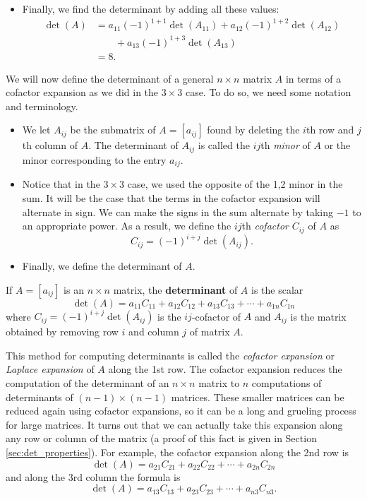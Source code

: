 \begin{itemize}
\item Finally, we find the determinant by adding all these values:
\begin{align*}
 \det(A) &= a_{11} (-1)^{1+1} \det(A_{11}) + a_{12} (-1)^{1+2} \det(A_{12}) \\
	&\qquad + a_{13} (-1)^{1+3} \det(A_{13}) \\
	&= 8.
\end{align*}

\end{itemize}

\label{sec:cofactors}

We will now define the determinant of a general $n \times n$ matrix $A$ in terms of a cofactor expansion as we did in the $3 \times 3$ case. To do so, we need some notation and terminology.

\begin{itemize}
\item We let $A_{ij}$ be the submatrix of $A = [a_{ij}]$ found by deleting the $i$th row and $j$th column of $A$. The determinant of $A_{ij}$ is called the $ij$th \emph{minor} of $A$ or the minor corresponding to the entry $a_{ij}$.
\item Notice that in the $3 \times 3$ case, we used the opposite of the 1,2 minor in the sum. It will be the case that the terms in the cofactor expansion will alternate in sign. We can make the signs in the sum alternate by taking $-1$ to an appropriate power. As a result, we define the $ij$th \emph{cofactor} $C_{ij}$ of $A$ as
\[C_{ij} = (-1)^{i+j} \det\left(A_{ij}\right).\]
\item Finally, we define the determinant of $A$. 
\end{itemize}

\begin{definition} If $A=[a_{ij}]$ is an $n \times n$ matrix, the \textbf{determinant} of $A$ is the scalar 
\[\det(A) = a_{11}C_{11} + a_{12}C_{12} + a_{13}C_{13} + \cdots + a_{1n}C_{1n}\]
where $C_{ij}= (-1)^{i+j} \det(A_{ij})$ is the $ij$-cofactor of $A$ and $A_{ij}$ is the matrix obtained by removing row $i$ and column $j$ of matrix $A$.
\end{definition}


This method for computing determinants is called the \emph{cofactor expansion} or \emph{Laplace expansion} of $A$ along the 1st row. The cofactor expansion reduces the computation of the determinant of an $n \times n$ matrix to $n$ computations of determinants of $(n-1) \times (n-1)$ matrices. These smaller matrices can be reduced again using cofactor expansions, so it can be a long and grueling process for large matrices. It turns out that we can actually take this expansion along any row or column of the matrix (a proof of this fact is given in Section \ref{sec:det_properties}). For example, the cofactor expansion along the 2nd row is  
\[\det(A) = a_{21}C_{21} + a_{22}C_{22} + \cdots + a_{2n}C_{2n}\]
and along the 3rd column the formula is
\[\det(A) = a_{13}C_{13} + a_{23}C_{23} + \cdots + a_{n3}C_{n3}.\]

